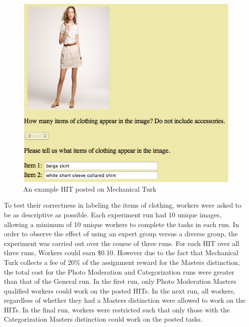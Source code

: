\documentclass{chi2012}
\newcommand{\tab}{\hspace*{2em}}
\begin{document}
\begin{figure}
\centering
\includegraphics[width=0.9\columnwidth]{Figure1}
\caption{An example HIT posted on Mechanical Turk}
\label{fig:figure1}
\end{figure}

\tab To test their correctness in labeling the items of clothing, workers were asked to be as descriptive as possible. Each experiment run had 10 unique images, allowing a minimum of 10 unique workers to complete the tasks in each run. In order to observe the effect of using an expert group versus a diverse group, the experiment was carried out over the course of three runs. For each HIT over all three runs, Workers could earn \$0.10. However due to the fact that Mechanical Turk collects a fee of 20\% of the assignment reward for the Masters distinction, the total cost for the Photo Moderation and Categorization runs were greater than that of the General run. In the first run, only Photo Moderation Masters qualified workers could work on the posted HITs. In the next run, all workers, regardless of whether they had a Masters distinction were allowed to work on the HITs. In the final run, workers were restricted such that only those with the Categorization Masters distinction could work on the posted tasks. 
\end{document}
